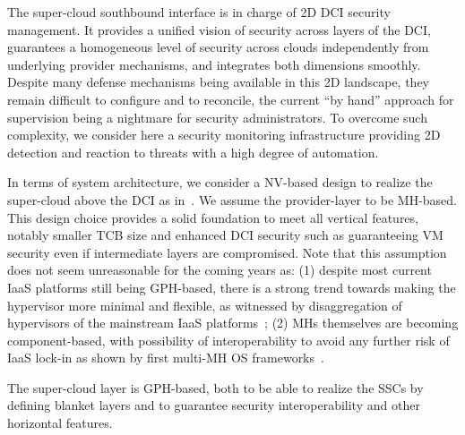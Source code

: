 \documentclass{sig-alternate}
\begin{document}
The super-cloud southbound interface is in charge of 2D DCI security management. It provides a unified vision of security across layers of the DCI, guarantees a homogeneous level of security across clouds independently from underlying provider mechanisms, and integrates both dimensions smoothly. 
Despite many defense mechanisms being available in this 2D landscape, they remain difficult to configure and to reconcile, the current ``by hand'' approach for supervision being a nightmare for security administrators. To overcome such complexity, we consider here a security monitoring infrastructure providing 2D detection and reaction to threats with a high degree of automation.

In terms of system architecture, we consider a NV-based design to realize the super-cloud above the DCI as in~\cite{xclo:blank}. 
We assume the provider-layer to be MH-based. 
This design choice provides a solid foundation to meet all vertical features, notably smaller TCB size and enhanced DCI security such as guaranteeing VM security even if intermediate layers are compromised. 
Note that this assumption does not seem unreasonable for the coming years as: 
(1) despite most current IaaS platforms still being GPH-based, there is a strong trend towards making the hypervisor more minimal and flexible, as witnessed by disaggregation of hypervisors of the mainstream IaaS platforms~\cite{XOAR,MinV}; 
(2) MHs themselves are becoming component-based, with possibility of interoperability to avoid any further risk of IaaS lock-in as shown by first multi-MH  OS frameworks~\cite{xmhf}. 
% 

The super-cloud layer is GPH-based, both to be able to realize the SSCs by defining blanket layers and to guarantee security interoperability and other horizontal features. 
\end{document}
